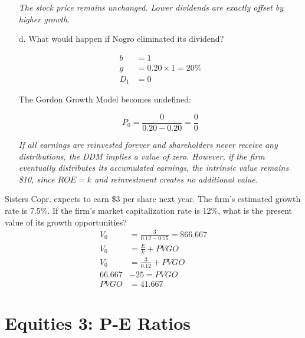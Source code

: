 \documentclass[11pt]{article}
\theoremstyle{definition}
\begin{document}
\begin{shaded}
\begin{enumerate}
        \textit{The stock price remains unchanged. Lower dividends
        are exactly offset by higher growth.}

        \item[d.] What would happen if Nogro eliminated its dividend?

        \begin{align*}
            b &= 1\\
            g &= 0.20 \times 1 = 20\%\\
            D_1 &= 0
        \end{align*}

        The Gordon Growth Model becomes undefined:

        \[
            P_0 = \frac{0}{0.20-0.20} = \frac{0}{0}
        \]

        \textit{If all earnings are reinvested forever and shareholders
        never receive any distributions, the DDM implies a value of
        zero. However, if the firm eventually distributes its
        accumulated earnings, the intrinsic value remains \$10,
        since $ROE=k$ and reinvestment creates no additional value.}

    \end{enumerate}
\end{shaded}

\begin{shaded}

        Sisters Copr. expects to earn \$3 per share next year.  The firm's estimated growth rate is 7.5\%.   If the firm's market capitalization rate is 12\%, what is the present value of its growth opportunities?
        \begin{align*}
        V_0 &= \frac{3}{0.12-0.75} = \$66.667\\
        V_0 &= \frac{E}{k} + PVGO\\
        V_0 &= \frac{3}{0.12} + PVGO \\
        66.667 &- 25 = PVGO \\
        PVGO &= 41.667
       \end{align*}

    \end{shaded}

\section{Equities 3: P-E Ratios}
\end{document}
